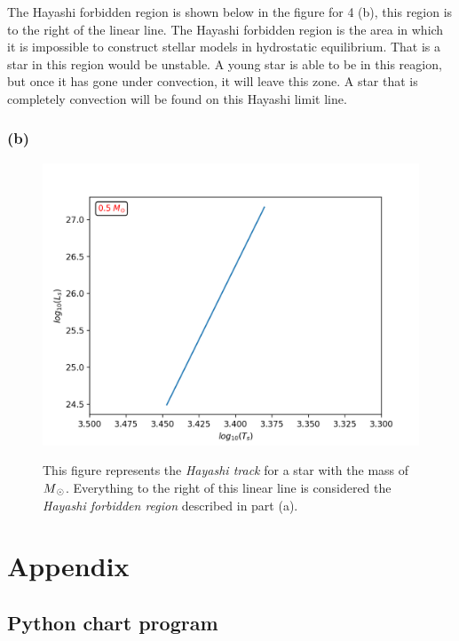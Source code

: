 \documentclass[11pt]{article}
\begin{document}
The Hayashi forbidden region is shown below in the figure for 4 (b), this region is to the right of the linear line. The Hayashi forbidden region is the area in which it is impossible to construct stellar models in hydrostatic equilibrium. That is a star in this region would be unstable. A young star is able to be in this reagion, but once it has gone under convection, it will leave this zone. A star that is completely convection will be found on this Hayashi limit line.

\subsubsection*{(b)}

\begin{figure}[h!]
    \centering
    {{\includegraphics[width=15cm]{problem_4_fig_1.png} }}%
    \caption{This figure represents the \emph{Hayashi track} for a star with the mass of $M\textsubscript{\(\odot\)}$. Everything to the right of this linear line is considered the \emph{Hayashi forbidden region} described in part (a). }%
    \label{fig:example}%
\end{figure}

\clearpage

\section*{Appendix}

\subsection*{Python chart program}


\clearpage


\end{document}
